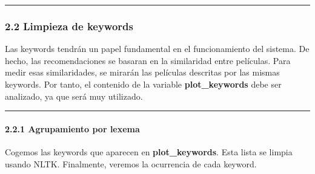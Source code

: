     \begin{center}\rule{0.5\linewidth}{\linethickness}\end{center}

\subsubsection{2.2 Limpieza de keywords}\label{limpieza-de-keywords}

Las keywords tendrán un papel fundamental en el funcionamiento del
sistema. De hecho, las recomendaciones se basaran en la similaridad
entre películas. Para medir esas similaridades, se mirarán las películas
descritas por las mismas keywords. Por tanto, el contenido de la
variable \textbf{plot\_keywords} debe ser analizado, ya que será muy
utilizado.

    \begin{center}\rule{0.5\linewidth}{\linethickness}\end{center}

\paragraph{2.2.1 Agrupamiento por lexema}\label{agrupamiento-por-lexema}

Cogemos las keywords que aparecen en \textbf{plot\_keywords}. Esta lista
se limpia usando NLTK. Finalmente, veremos la ocurrencia de cada
keyword.

